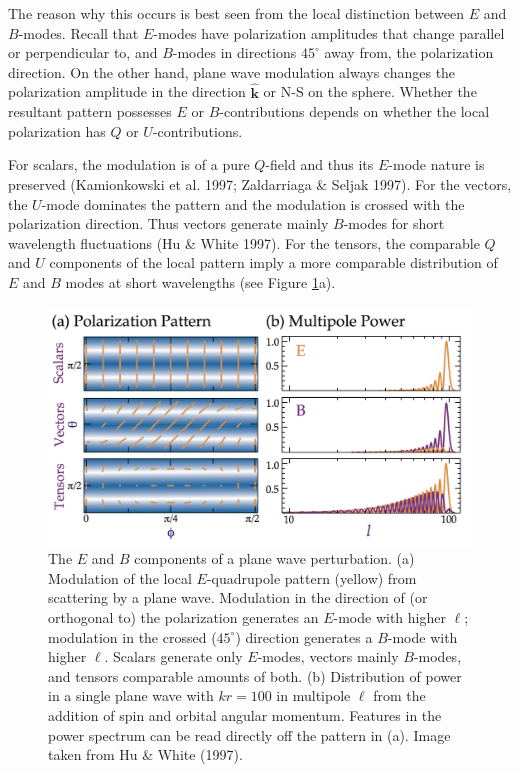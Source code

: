 \documentclass[a4paper,11pt]{article}
\begin{document}
{\noindent}The reason why this occurs is best seen from the local distinction between $E$ and $B$-modes. Recall that $E$-modes have polarization amplitudes that change parallel or perpendicular to, and $B$-modes in directions $45^\circ$ away from, the polarization direction. On the other hand, plane wave modulation always changes the polarization amplitude in the direction $\bm{\hat{k}}$ or N-S on the sphere. Whether the resultant pattern possesses $E$ or $B$-contributions depends on whether the local polarization has $Q$ or $U$-contributions.

{\noindent}For scalars, the modulation is of a pure $Q$-field and thus its $E$-mode nature is preserved (Kamionkowski et al. 1997; Zaldarriaga \& Seljak 1997). For the vectors, the $U$-mode dominates the pattern and the modulation is crossed with the polarization direction. Thus vectors generate mainly $B$-modes for short wavelength fluctuations (Hu \& White 1997). For the tensors, the comparable $Q$ and $U$ components of the local pattern imply a more comparable distribution of $E$ and $B$ modes at short wavelengths (see Figure \ref{fig:polpatterns}a).

\begin{figure}[t!]
    \centering
    \includegraphics[width=16cm]{figures/PolPatterns.png}
    \caption{\footnotesize{The $E$ and $B$ components of a plane wave perturbation. (a) Modulation of the local $E$-quadrupole pattern (yellow) from scattering by a plane wave. Modulation in the direction of (or orthogonal to) the polarization generates an $E$-mode with higher $\ell$; modulation in the crossed ($45^\circ$) direction generates a $B$-mode with higher $\ell$. Scalars generate only $E$-modes, vectors mainly $B$-modes, and tensors comparable amounts of both. (b) Distribution of power in a single plane wave with $kr=100$ in multipole $\ell$ from the addition of spin and orbital angular momentum. Features in the power spectrum can be read directly off the pattern in (a). Image taken from Hu \& White (1997).}}
    \label{fig:polpatterns}
\end{figure}
\end{document}
